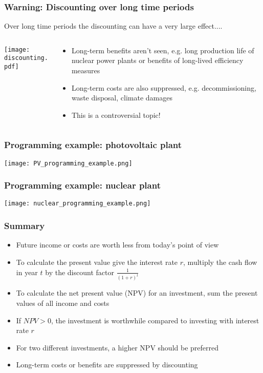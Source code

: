 \documentclass[10pt,aspectratio=169,dvipsnames]{beamer}
\let\olditem\item
\renewcommand{\item}{%
\olditem\vspace{5pt}}
\begin{document}
\begin{frame}
  \frametitle{Warning: Discounting over long time periods}

  Over long time periods the discounting can have a very large effect....

  \begin{columns}[T]
\begin{column}{9cm}
  \centering
  \texttt{[image: discounting.pdf]}
\end{column}
\begin{column}{5cm}
  \begin{itemize}
  \item Long-term benefits aren't seen, e.g. long production life of nuclear power plants or benefits of long-lived efficiency measures
  \item Long-term costs are also suppressed, e.g. decommissioning, waste disposal, climate damages
  \item This is a \alert{controversial topic!}
  \end{itemize}
\end{column}
  \end{columns}

\end{frame}



\begin{frame}
  \frametitle{Programming example: photovoltaic plant}

  \centering
  \texttt{[image: PV\_programming\_example.png]}


\end{frame}

\begin{frame}
  \frametitle{Programming example: nuclear plant}

  \centering
  \texttt{[image: nuclear\_programming\_example.png]}


\end{frame}




\begin{frame}
  \frametitle{Summary}

  \begin{itemize}
  \item Future income or costs are worth less from today's point of view
  \item To calculate the \alert{present value} give the \alert{interest rate} $r$, multiply the cash flow in year $t$ by the \alert{discount factor}  $\frac{1}{(1+r)^t}$
  \item To calculate the \alert{net present value (NPV)} for an investment, sum the present values of all income and costs
  \item If  $NPV > 0$, the investment is worthwhile compared to investing with interest rate $r$
  \item For two different investments, a higher NPV should be preferred
  \item \alert{Long-term} costs or benefits are \alert{suppressed} by discounting
  \end{itemize}

\end{frame}
\end{document}
